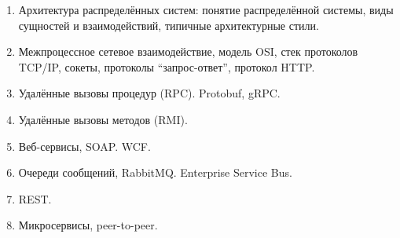 \documentclass[a5paper]{article}
\begin{document}
\begin{enumerate}
	\item Архитектура распределённых систем: понятие распределённой системы, виды сущностей и взаимодействий, типичные архитектурные стили.
	\item Межпроцессное сетевое взаимодействие, модель OSI, стек протоколов TCP/IP, сокеты, протоколы ``запрос-ответ'', протокол HTTP.
	\item Удалённые вызовы процедур (RPC). Protobuf, gRPC.
	\item Удалённые вызовы методов (RMI).
	\item Веб-сервисы, SOAP. WCF.
	\item Очереди сообщений, RabbitMQ. Enterprise Service Bus.
	\item REST.
	\item Микросервисы, peer-to-peer.
\end{enumerate}
\end{document}
